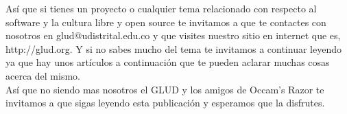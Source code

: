 \begin{textblock}{20}
\begin{minipage}{.45\linewidth}
Así que si tienes un proyecto o cualquier tema relacionado con respecto al software y la cultura libre y
open source te invitamos a que te contactes con nosotros en glud@udistrital.edu.co y que visites
nuestro sitio en internet que es, http://glud.org. Y si no sabes mucho del tema te invitamos a continuar
leyendo ya que hay unos artículos a continuación que te pueden aclarar muchas cosas acerca del
mismo.\\ 

Así que no siendo mas nosotros el GLUD y los amigos de Occam's Razor te invitamos a que sigas leyendo 
esta publicación y esperamos que la disfrutes.\\

\bigskip



\begin{flushright}
{\Large{}}
\end{flushright}


\vspace{5cm}

\bigskip


\end{minipage}

\bigskip

\colorbox{introcolor}{
\begin{minipage}{.45\linewidth}

\bigskip

{\footnotesize{}}

\bigskip

\end{minipage}
}


\end{textblock}

\pagebreak
